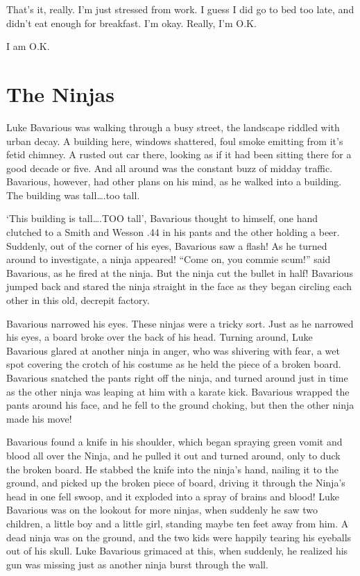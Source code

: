 That's it, really. I'm just stressed from work. I guess
I did go to bed too late, and didn't eat enough for
breakfast. I'm okay. Really, I'm O.K.

I am O.K. 
 



\chapter{The Ninjas}





Luke Bavarious was walking through a busy street, the landscape
riddled with urban decay. A building here, windows shattered, foul
smoke emitting from it's fetid chimney. A rusted out car
there, looking as if it had been sitting there for a good decade or
five. And all around was the constant buzz of midday traffic.
Bavarious, however, had other plans on his mind, as he walked into
a building. The building was tall{\ldots}.too tall.



`This building is tall{\ldots}.TOO tall', Bavarious
thought to himself, one hand clutched to a Smith and Wesson .44 in
his pants and the other holding a beer. Suddenly, out of the corner
of his eyes, Bavarious saw a flash! As he turned around to
investigate, a ninja appeared! ``Come on, you commie
scum!'' said Bavarious, as he fired at the ninja. But the
ninja cut the bullet in half! Bavarious jumped back and stared the
ninja straight in the face as they began circling each other in
this old, decrepit factory.



Bavarious narrowed his eyes. These ninjas were a tricky sort. Just
as he narrowed his eyes, a board broke over the back of his head.
Turning around, Luke Bavarious glared at another ninja in anger,
who was shivering with fear, a wet spot covering the crotch of his
costume as he held the piece of a broken board. Bavarious snatched
the pants right off the ninja, and turned around just in time as
the other ninja was leaping at him with a karate kick. Bavarious
wrapped the pants around his face, and he fell to the ground
choking, but then the other ninja made his move!



Bavarious found a knife in his shoulder, which began spraying green
vomit and blood all over the Ninja, and he pulled it out and turned
around, only to duck the broken board. He stabbed the knife into
the ninja's hand, nailing it to the ground, and picked up the
broken piece of board, driving it through the Ninja's head in
one fell swoop, and it exploded into a spray of brains and blood!
Luke Bavarious was on the lookout for more ninjas, when suddenly he
saw two children, a little boy and a little girl, standing maybe
ten feet away from him. A dead ninja was on the ground, and the two
kids were happily tearing his eyeballs out of his skull. Luke
Bavarious grimaced at this, when suddenly, he realized his gun was
missing just as another ninja burst through the wall.



